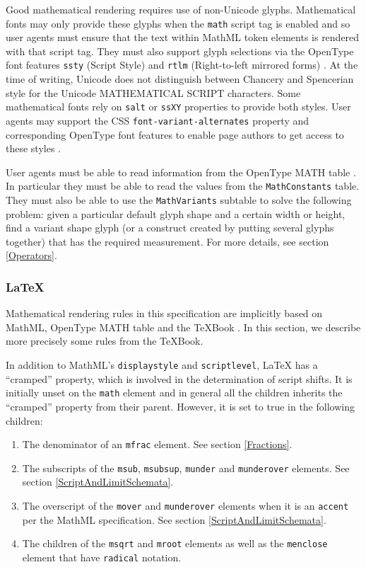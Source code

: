 Good mathematical rendering requires use of non-Unicode glyphs. Mathematical
fonts may only provide these glyphs when the {\tt math}
script tag is enabled and so user agents must ensure that the text within
MathML token
elements is rendered with that script tag. They must also support glyph
selections via the OpenType font features
{\tt ssty} (Script Style)
and {\tt rtlm} (Right-to-left mirrored forms) \cite{OpenFontFormat3}.
At the time of writing, Unicode does not distinguish between Chancery and
Spencerian style for the Unicode MATHEMATICAL SCRIPT characters. Some
mathematical fonts rely on {\tt salt} or {\tt ssXY} properties to provide
both styles. User agents may support the CSS {\tt font-variant-alternates}
property and corresponding OpenType font features to enable page authors
to get access to these styles \cite{CSS3Font} \cite{OpenFontFormat3}.

User agents must be able to read information from the
OpenType MATH table \cite{OpenFontFormat3}.
In particular they must be able to read the values from the
{\tt MathConstants} table.
They must also be able to use the {\tt MathVariants} subtable
to solve the following problem: given a particular default glyph shape and a
certain width or height, find a variant shape glyph (or a construct created by
putting several glyphs together) that has the required measurement.
For more details, see section \ref{Operators}.

\subsubsection{LaTeX}\label{LaTeX}

Mathematical rendering rules in this specification are implicitly based on
MathML, OpenType MATH table and the TeXBook
\cite{MathML3} \cite{OpenFontFormat3} \cite{TeXBook}. In this section, we
describe more precisely some rules from the TeXBook.

In addition to MathML's {\tt displaystyle} and {\tt scriptlevel}, LaTeX has
a ``cramped'' property, which is involved in the determination of script shifts.
It is initially unset on the {\tt math} element and in general
all the children inherits the ``cramped'' property from their parent.
However, it is set to true in the following children:

\begin{enumerate}
\item The denominator of an {\tt mfrac} element. See section \ref{Fractions}.
\item The subscripts of the {\tt msub}, {\tt msubsup},
  {\tt munder} and {\tt munderover} elements.
  See section \ref{ScriptAndLimitSchemata}.
\item The overscript of the
  {\tt mover} and {\tt munderover} elements when it is an {\tt accent} per
  the MathML specification. See section \ref{ScriptAndLimitSchemata}.
\item The children of the {\tt msqrt} and {\tt mroot}
  elements as well as the {\tt menclose} element that have {\tt radical}
  notation.
\end{enumerate}

